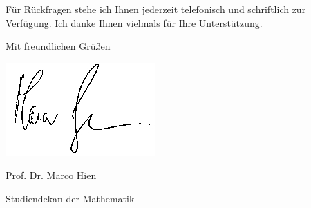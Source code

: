 \documentclass{zirkelbrief}
\begin{document}
Für Rückfragen stehe ich Ihnen jederzeit telefonisch und schriftlich
zur Verfügung. Ich danke Ihnen vielmals für Ihre Unterstützung.

Mit freundlichen Grüßen

\hspace{1cm} \includegraphics[scale=0.4]{unterschrift_marco_hien}

\vspace{-0.4cm}

Prof. Dr. Marco Hien

\vspace{-0.2cm}

{\small Studiendekan der Mathematik}
\end{document}
